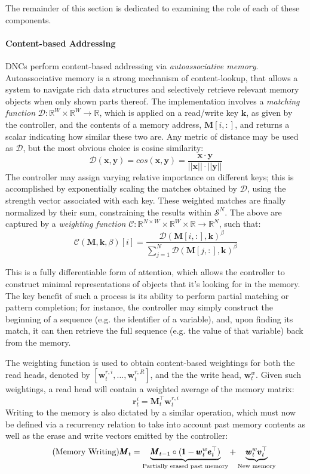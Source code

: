 \documentclass[]{article}
\begin{document}
The remainder of this section is dedicated to examining the role of each of these components.

\paragraph{Content-based Addressing} 
DNCs perform content-based addressing via \textit{autoassociative memory}. Autoassociative memory is a strong mechanism of content-lookup, that allows a system to navigate rich data structures and selectively retrieve relevant memory objects when only shown parts thereof. The implementation involves a \textit{matching function} $\mathcal{D}: \mathbb{R}^W \times \mathbb{R}^W \to \mathbb{R}$, which is applied on a read/write key $\pmb{k}$, as given by the controller, and the contents of a memory address, $\pmb{M}[i,:]$, and returns a scalar indicating how similar these two are. Any metric of distance may be used as $\mathcal{D}$, but the most obvious choice is cosine similarity:
 \[
 \tag{Cosine Similarity} \label{eqn:Cosine}
\mathcal{D}(\pmb{x}, \pmb{y}) = cos(\pmb{x},\pmb{y}) = \frac{\pmb{x} \cdot \pmb{y}}{||\pmb{x}|| \cdot ||\pmb{y}||}
\]
The controller may assign varying relative importance on different keys; this is accomplished by exponentially scaling the matches obtained by $\mathcal{D}$, using the strength vector associated with each key. These weighted matches are finally normalized by their sum, constraining the results within $\mathcal{S}^N$. The above are captured by a \textit{weighting function} $\mathcal{C}: \mathbb{R}^{N \times W} \times \mathbb{R}^W \times \mathbb{R} \to \mathbb{R}^N$, such that:
\[
\tag{Weighting Function}
\mathcal{C}(\pmb{M},\pmb{k}, \beta)[i] = 
\frac{ \mathcal{D}(\pmb{M}[i,:],\pmb{k})^{\beta} }
{\sum\nolimits_{j=1}^N \mathcal{D}(\pmb{M}[j,:],\pmb{k})^{\beta}}
\]

This is a fully differentiable form of attention, which allows the controller to construct minimal representations of objects that it's looking for in the memory. The key benefit of such a process is its ability to perform partial matching or pattern completion; for instance, the controller may simply construct the beginning of a sequence (e.g. the identifier of a variable), and, upon finding its match, it can then retrieve the full sequence (e.g. the  value of that variable) back from the memory.

The weighting function is used to obtain content-based weightings for both the read heads, denoted by $[\pmb{w}_t^{r,i},\dots,\pmb{w}_t^{r,R}]$, and the the write head, $\pmb{w}_t^w$. Given such weightings, a read head will contain a weighted average of the memory matrix:
\[
\tag{Memory Reading}
\pmb{r}_t^i = \pmb{M}_t^{\top} \pmb{w}_t^{r,i} 
\]
Writing to the memory is also dictated by a similar operation, which must now be defined via a recurrency relation to take into account past memory contents as well as the erase and write vectors emitted by the controller:
\[
\tag{Memory Writing}
\pmb{M}_t = \underbrace{\pmb{M}_{t-1} \circ (\pmb{1} - \pmb{w}_t^w \pmb{e}_t^\top)}_{\text{\scriptsize Partially erased past memory}} + \underbrace{\pmb{w}_t^w \pmb{v}_t^\top}_{\text{\scriptsize New memory}}
\]
\end{document}
